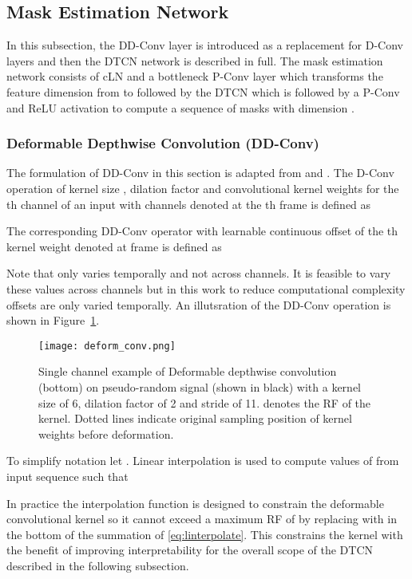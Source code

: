 \documentclass{article}
\begin{document}
\subsection{Mask Estimation Network}
In this subsection, the \ac{DD-Conv} layer is introduced as a replacement for \ac{D-Conv} layers and then the \ac{DTCN} network is described in full.
The mask estimation network consists of \ac{cLN} and a bottleneck \ac{P-Conv} layer which transforms the feature dimension from  to  followed by the \ac{DTCN} which is followed by a \ac{P-Conv} and \ac{ReLU} activation to compute a sequence of masks  with dimension  \cite{convtasnet}.

\subsubsection{Deformable Depthwise Convolution (DD-Conv)}
The formulation of \ac{DD-Conv} in this section is adapted from \cite{deformconv} and \cite{1ddconv}. The \ac{D-Conv} operation of kernel size , dilation factor  and convolutional kernel weights for the th channel of an input with  channels denoted  at the th frame is defined as

The corresponding \ac{DD-Conv} operator with learnable continuous offset of the th kernel weight denoted  at frame  is defined as

Note that  only varies temporally and not across channels. It is feasible to vary these values across channels but in this work to reduce computational complexity offsets are only varied temporally. An illutsration of the \ac{DD-Conv} operation is shown in Figure~\ref{fig:deform_conv}.
\begin{figure}[!thb]
    \centering
\texttt{[image: deform\_conv.png]}
\caption{
    Single channel example of 
Deformable depthwise convolution (bottom) on pseudo-random signal (shown in black) with a kernel size of 6, dilation factor of 2 and stride of 11.  denotes the \ac{RF} of the kernel. Dotted lines indicate original sampling position of kernel weights before deformation.}
    \label{fig:deform_conv}
\end{figure}
To simplify notation let . Linear interpolation is used to compute values of  from input sequence  such that

In practice the interpolation function is designed to constrain the deformable convolutional kernel so it cannot exceed a maximum \ac{RF} of  by replacing  with  in the bottom of the summation of \eqref{eq:linterpolate}. This constrains the kernel with the benefit of improving interpretability for the overall scope of the \ac{DTCN} described in the following subsection.
\end{document}
